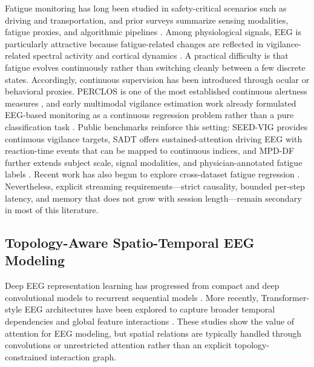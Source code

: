\documentclass[preprint,12pt]{elsarticle}
\begin{document}
Fatigue monitoring has long been studied in safety-critical scenarios such as driving and transportation, and prior surveys summarize sensing modalities, fatigue proxies, and algorithmic pipelines \cite{Sikander2019DriverFatigueReview,Williamson2011FatigueSafety}. 
Among physiological signals, EEG is particularly attractive because fatigue-related changes are reflected in vigilance-related spectral activity and cortical dynamics \cite{Lal2001DriverFatigue,Eoh2005DrowsinessEEG}. 
A practical difficulty is that fatigue evolves continuously rather than switching cleanly between a few discrete states. 
Accordingly, continuous supervision has been introduced through ocular or behavioral proxies. 
PERCLOS is one of the most established continuous alertness measures \cite{Dinges1998PERCLOS}, and early multimodal vigilance estimation work already formulated EEG-based monitoring as a continuous regression problem rather than a pure classification task \cite{Zheng2017CriticalBands}. 
Public benchmarks reinforce this setting: SEED-VIG provides continuous vigilance targets, SADT offers sustained-attention driving EEG with reaction-time events that can be mapped to continuous indices, and MPD-DF further extends subject scale, signal modalities, and physician-annotated fatigue labels \cite{Zheng2017CriticalBands,cao2019multi,Li2026MPDDF}. 
Recent work has also begun to explore cross-dataset fatigue regression \cite{Yuan2023CrossDatasetFatigue}. 
Nevertheless, explicit streaming requirements---strict causality, bounded per-step latency, and memory that does not grow with session length---remain secondary in most of this literature.

\subsection{Topology-Aware Spatio-Temporal EEG Modeling}

Deep EEG representation learning has progressed from compact and deep convolutional models to recurrent sequential models \cite{Roy2019DeepLearningEEGReview,Lawhern2018EEGNet,Schirrmeister2017DeepConvNets,Hochreiter1997LSTM}. 
More recently, Transformer-style EEG architectures have been explored to capture broader temporal dependencies and global feature interactions \cite{vaswani2017attention,song2023eeg}. 
These studies show the value of attention for EEG modeling, but spatial relations are typically handled through convolutions or unrestricted attention rather than an explicit topology-constrained interaction graph. 
\end{document}
